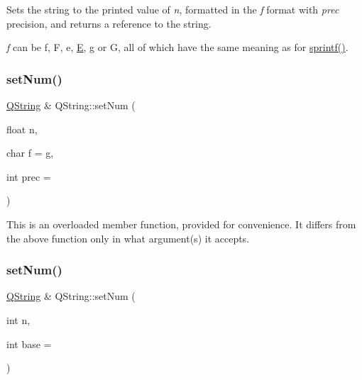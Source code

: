 Sets the string to the printed value of {\itshape n}, formatted in the {\itshape f} format with {\itshape prec} precision, and returns a reference to the string.

{\itshape f} can be \textquotesingle{}f\textquotesingle{}, \textquotesingle{}F\textquotesingle{}, \textquotesingle{}e\textquotesingle{}, \textquotesingle{}\mbox{\hyperlink{class_e}{E}}\textquotesingle{}, \textquotesingle{}g\textquotesingle{} or \textquotesingle{}G\textquotesingle{}, all of which have the same meaning as for \mbox{\hyperlink{class_q_string_a0b6622a8335cdd080e8b1685b7e0fde0}{sprintf()}}. \mbox{\label{class_q_string_a3cadb18e23db15cdd65c699d8b427100}} 
\subsubsection{\texorpdfstring{setNum()}{setNum()}\hspace{0.1cm}{\footnotesize\ttfamily [2/8]}}
{\footnotesize\ttfamily \mbox{\hyperlink{class_q_string}{Q\+String}} \& Q\+String\+::set\+Num (\begin{DoxyParamCaption}\item[{float}]{n,  }\item[{char}]{f = {\ttfamily \textquotesingle{}g\textquotesingle{}},  }\item[{int}]{prec = {} }\end{DoxyParamCaption})\hspace{0.3cm}{\ttfamily [inline]}}

This is an overloaded member function, provided for convenience. It differs from the above function only in what argument(s) it accepts.\mbox{\label{class_q_string_ad8a0d9546beed24f51af855a024af9a8}} 
\subsubsection{\texorpdfstring{setNum()}{setNum()}\hspace{0.1cm}{\footnotesize\ttfamily [3/8]}}
{\footnotesize\ttfamily \mbox{\hyperlink{class_q_string}{Q\+String}} \& Q\+String\+::set\+Num (\begin{DoxyParamCaption}\item[{int}]{n,  }\item[{int}]{base = {} }\end{DoxyParamCaption})\hspace{0.3cm}{\ttfamily [inline]}}

